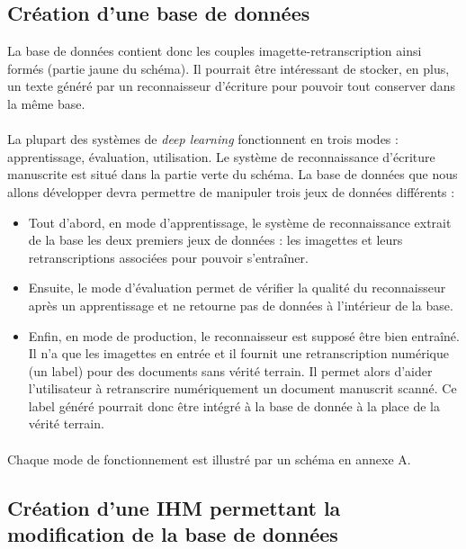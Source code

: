 \subsection{Création d'une base de données}

La base de données contient donc les couples imagette-retranscription ainsi formés (partie jaune du schéma).
Il pourrait être intéressant de stocker, en plus, un texte généré par un reconnaisseur d’écriture pour
pouvoir tout conserver dans la même base.

\paragraph{}
La plupart des systèmes de \textit{deep learning} fonctionnent en trois modes : apprentissage, évaluation,
utilisation. Le système de reconnaissance d’écriture manuscrite est situé dans la partie verte du schéma.
La base de données que nous allons développer devra permettre de manipuler trois jeux de données différents : 

\begin{itemize}
\item Tout d’abord, en mode d’apprentissage, le système de reconnaissance extrait de la base les deux premiers
jeux de données : les imagettes et leurs retranscriptions associées pour pouvoir s'entraîner.
\item Ensuite, le mode d'évaluation permet de vérifier la qualité du reconnaisseur après un apprentissage
et ne retourne pas de données à l’intérieur de la base.
\item Enfin, en mode de production, le reconnaisseur est supposé être bien entraîné. Il n’a que les imagettes
en entrée et il fournit une retranscription numérique (un label) pour des documents sans vérité terrain.
Il permet alors d’aider l’utilisateur à retranscrire numériquement un document manuscrit scanné.
Ce label généré pourrait donc être intégré à la base de donnée à la place de la vérité terrain. 
\end{itemize}

\paragraph{}
Chaque mode de fonctionnement est illustré par un schéma en annexe A.

\subsection{Création d'une IHM permettant la modification de la base de données}

